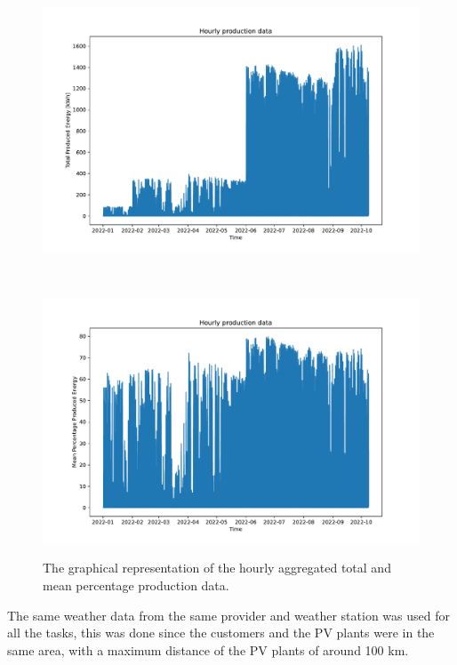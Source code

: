\begin{figure}[H]
\begin{minipage}[b]{8.5cm}
\centering
\includegraphics[width=1\textwidth]{images/production/data_plot}
\subcaption{}
\label{fig:productiondataplot}
\end{minipage}
\ \hspace{2mm} \
\begin{minipage}[b]{8.5cm}
\centering
\includegraphics[width=1\textwidth]{images/production/data_plot_percentage}
\subcaption{}
\label{fig:productiondataplotpercentage}
\end{minipage}
\caption{The graphical representation of the hourly aggregated  total and  mean percentage production data.}
\end{figure}

The same weather data from the same provider and weather station was used for all the tasks, this was done since the customers and the PV plants were in the same area, with a maximum distance of the PV plants of around 100 km.


